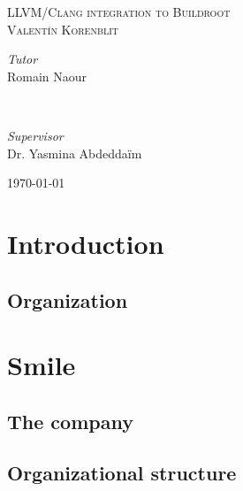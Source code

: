 \documentclass[12pt,a4paper,oneside]{article}
\begin{document}
\begin{titlepage}
	\textsc{\Large LLVM/Clang integration to Buildroot}\\[1cm]

	\textsc{\large Valent\'{i}n Korenblit}\\[1cm]

	\begin{minipage}{0.4\textwidth}
		\begin{flushleft}
			\large
			\textit{Tutor}\\
			Romain Naour %
		\end{flushleft}
	\end{minipage}
	~
	\begin{minipage}{0.4\textwidth}
		\begin{flushright}
			\large
			\textit{Supervisor}\\
			Dr. Yasmina Abdedda\"{i}m %
		\end{flushright}
	\end{minipage}

	\vfill\vfill\vfill %

	{\large\today} %

	\vfill %

\end{titlepage}

\begin{abstract}

\end{abstract}
\newpage

\tableofcontents

\newpage
\section{Introduction}
\subsection{Organization}

\newpage
\section{Smile}
\subsection{The company}
\subsection{Organizational structure}
\end{document}

